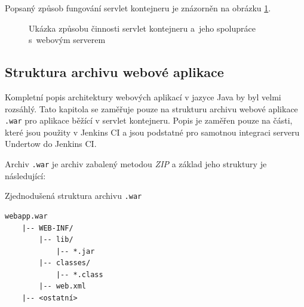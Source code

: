             Popsaný způsob fungování servlet kontejneru je znázorněn na obrázku \ref{imgServlet}.
            \begin{figure}[ht]
                \begin{center}
                    \caption{Ukázka způsobu činnosti servlet kontejneru a~jeho spolupráce s~webovým serverem \cite{webserverVsServletPage}}
                    \label{imgServlet}
                \end{center}
            \end{figure}   %

        \subsection{Struktura archivu webové aplikace} \label{kapWebXml}
            Kompletní popis architektury webových aplikací v jazyce Java by byl velmi rozsáhlý. 
            Tato kapitola se zaměřuje pouze na strukturu archivu webové aplikace \texttt{.war} pro aplikace běžící v servlet kontejneru.
            Popis je zaměřen pouze na části, které jsou použity v Jenkins CI a jsou podstatné
            pro samotnou integraci serveru Undertow do Jenkins CI.

            \medskip
            Archiv \texttt{.war} je archiv zabalený metodou \emph{ZIP} a základ jeho struktury je následující:
            
\begin{priklad} Zjednodušená struktura archivu \texttt{.war}
\begin{verbatim}
webapp.war
    |-- WEB-INF/
        |-- lib/
            |-- *.jar
        |-- classes/
            |-- *.class
        |-- web.xml
    |-- <ostatní>
\end{verbatim}
\end{priklad}


